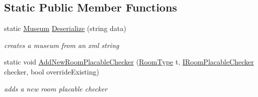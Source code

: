 \subsection*{Static Public Member Functions}
\begin{DoxyCompactItemize}
\item 
static \mbox{\hyperlink{class_museum}{Museum}} \mbox{\hyperlink{class_museum_a1b4fb627a19112e3ba3d25e8108de2c3}{Deserialize}} (string data)
\begin{DoxyCompactList}\small\item\em creates a museum from an xml string \end{DoxyCompactList}\item 
static void \mbox{\hyperlink{class_museum_a4317c41f1bef1ffeee3678f5c342c9aa}{Add\+New\+Room\+Placable\+Checker}} (\mbox{\hyperlink{_room_8cs_ab540f7414f306325d92272bcef1e34e1}{Room\+Type}} t, \mbox{\hyperlink{interface_i_room_placable_checker}{I\+Room\+Placable\+Checker}} checker, bool override\+Existing)
\begin{DoxyCompactList}\small\item\em adds a new room placable checker \end{DoxyCompactList}\end{DoxyCompactItemize}
